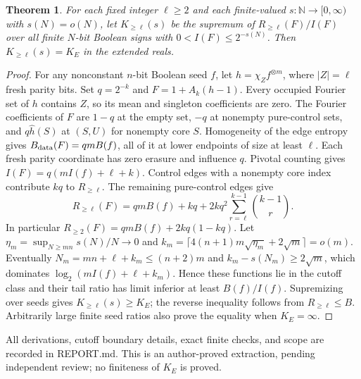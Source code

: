\documentclass{article}
\newtheorem{theorem}{Theorem}
\begin{document}
\begin{theorem}
For each fixed integer $\ell\ge2$ and each finite-valued $s:\mathbb N\to[0,\infty)$ with $s(N)=o(N)$, let $K_{\ge\ell}(s)$ be the supremum of $R_{\ge\ell}(F)/I(F)$ over all finite $N$-bit Boolean signs with $0<I(F)\le2^{-s(N)}$. Then $K_{\ge\ell}(s)=K_E$ in the extended reals.
\end{theorem}
\begin{proof}
For any nonconstant $n$-bit Boolean seed $f$, let $h=\chi_Z f^{\otimes m}$, where $|Z|=\ell$ fresh parity bits. Set $q=2^{-k}$ and $F=1+A_k(h-1)$. Every occupied Fourier set of $h$ contains $Z$, so its mean and singleton coefficients are zero. The Fourier coefficients of $F$ are $1-q$ at the empty set, $-q$ at nonempty pure-control sets, and $q\widehat h(S)$ at $(S,U)$ for nonempty core $S$. Homogeneity of the edge entropy gives $B_{\rm data}(F)=q mB(f)$, all of it at lower endpoints of size at least $\ell$. Each fresh parity coordinate has zero erasure and influence $q$. Pivotal counting gives $I(F)=q(mI(f)+\ell+k)$.
Control edges with a nonempty core index contribute $kq$ to $R_{\ge\ell}$. The remaining pure-control edges give
\[
R_{\ge\ell}(F)=qmB(f)+kq+2kq^2\sum_{r=\ell}^{k-1}\binom{k-1}{r}.
\]
In particular $R_{\ge2}(F)=qmB(f)+2kq(1-kq)$.
Let $\eta_m=\sup_{N\ge mn}s(N)/N\to0$ and $k_m=\lceil4(n+1)m\sqrt{\eta_m}+2\sqrt m\rceil=o(m)$. Eventually $N_m=mn+\ell+k_m\le(n+2)m$ and $k_m-s(N_m)\ge2\sqrt m$, which dominates $\log_2(mI(f)+\ell+k_m)$. Hence these functions lie in the cutoff class and their tail ratio has limit inferior at least $B(f)/I(f)$. Supremizing over seeds gives $K_{\ge\ell}(s)\ge K_E$; the reverse inequality follows from $R_{\ge\ell}\le B$. Arbitrarily large finite seed ratios also prove the equality when $K_E=\infty$.
\end{proof}
All derivations, cutoff boundary details, exact finite checks, and scope are recorded in REPORT.md. This is an author-proved extraction, pending independent review; no finiteness of $K_E$ is proved.
\end{document}
